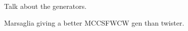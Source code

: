 Talk about the generators.

\cite{Marsaglia:2003:SRN:769800.769827} Marsaglia giving a better MCCSFWCW gen than twister.
